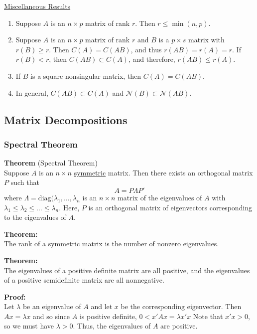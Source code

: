 \documentclass[12pt]{article}
\numberwithin{equation}{section}
\begin{document}
\underline{Miscellaneous Results}
\begin{enumerate}
  \item Suppose $A$ is an $n \times p$ matrix of rank $r$. Then $r \le \min(n, p)$.
  \item Suppose $A$ is an $n \times p$ matrix of rank $r$ and $B$ is a $p \times s$ matrix with $r(B) \ge r$. Then $C(A) = C(AB)$, and thus $r(AB) = r(A) = r$. If $r(B) < r$, then $C(AB) \subset C(A)$, and therefore, $r(AB) \le r(A)$.
  \item If $B$ is a square nonsingular matrix, then $C(A) = C(AB)$.
  \item In general, $C(AB) \subset C(A)$ and $\mathcal{N}(B) \subset \mathcal{N}(AB)$.
\end{enumerate}

\subsection{Matrix Decompositions}
\subsubsection{Spectral Theorem}
\textbf{Theorem} (Spectral Theorem) \\
Suppose $A$ is an $n \times n$ \underline{symmetric} matrix. Then there exists an orthogonal matrix $P$ such that 
\begin{equation*}
  A = P \Lambda P'
\end{equation*}
where $\Lambda = \text{diag}(\lambda_1, \ldots, \lambda_n$ is an $n \times n$ matrix of the eigenvalues of $A$ with $\lambda_1 \le \lambda_2 \le \ldots \le \lambda_n$. Here, $P$ is an orthogonal matrix of eigenvectors corresponding to the eigenvalues of $A$.

\textbf{Theorem:}\\
The rank of a symmetric matrix is the number of nonzero eigenvalues.

\textbf{Theorem:} \\
The eigenvalues of a positive definite matrix are all positive, and the eigenvalues of a positive semidefinite matrix are all nonnegative.

\textbf{Proof:}\\
Let $\lambda$ be an eigenvalue of $A$ and let $x$ be the corresponding eigenvector. Then $Ax = \lambda x$ and so since $A$ is positive definite,  $0 < x' A x = \lambda x'x$ Note that $x'x > 0$, so we must have $\lambda > 0$. Thus, the eigenvalues of $A$ are positive.
\end{document}
